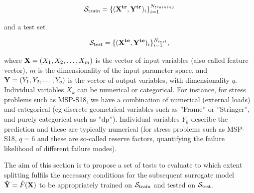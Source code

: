 $${\cal S}_{\text{train}}=\{({\bf X^{tr}},{\bf Y^{tr}})_i\}_{i=1}^{N_{training}}$$

and a test set

$${\cal S}_{\text{test}}=\{({\bf X^{te}},{\bf Y^{te}})_i\}_{i=1}^{N_{test}},$$

where ${\bf X}=(X_1,X_2,\dots,X_m)$ is the vector of input variables (also called feature vector), $m$ is the dimensionality of the input parameter space, and ${\bf Y}=(Y_1,Y_2,\dots,Y_q)$ is the vector of output variables, with dimensionality $q$. Individual variables $X_k$ can be numerical or categorical. For instance, for stress problems such as MSP-S18, we have a combination of numerical  (\eg external loads) and categorical (eg discrete geometrical variables such as ''Frame'' or ''Stringer'', and purely categorical such as ''dp''). Individual variables $Y_k$ describe the prediction and these are typically numerical (for stress problems such as MSP-S18, $q=6$ and these are so-called reserve factors, quantifying the failure likelihood of different failure modes).

The aim of this section is to propose a set of tests to evaluate to which extent splitting fulfils the necessary conditions for the subsequent surrogate model ${\bf \hat{Y}}=\hat{F}({\bf X})$ to be appropriately trained on ${\cal S}_{\text{train}}$ and tested on ${\cal S}_{\text{test}}$.\\
%
 
